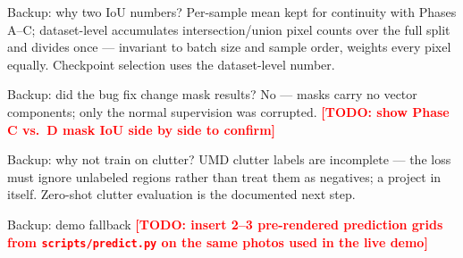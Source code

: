 \documentclass[aspectratio=169,10pt]{beamer}
\newcommand{\todo}[1]{\textcolor{red}{\textbf{[TODO: #1]}}}
\begin{document}
\begin{frame}{Backup: why two IoU numbers?}
  Per-sample mean kept for continuity with Phases A--C; dataset-level
  accumulates intersection/union pixel counts over the full split and divides
  once --- invariant to batch size and sample order, weights every pixel
  equally. Checkpoint selection uses the dataset-level number.
\end{frame}

\begin{frame}{Backup: did the bug fix change mask results?}
  No --- masks carry no vector components; only the normal supervision was
  corrupted. \todo{show Phase C vs.\ D mask IoU side by side to confirm}
\end{frame}

\begin{frame}{Backup: why not train on clutter?}
  UMD clutter labels are incomplete --- the loss must ignore unlabeled regions
  rather than treat them as negatives; a project in itself. Zero-shot clutter
  evaluation is the documented next step.
\end{frame}

\begin{frame}{Backup: demo fallback}
  \todo{insert 2--3 pre-rendered prediction grids from
  \texttt{scripts/predict.py} on the same photos used in the live demo}
\end{frame}
\end{document}
